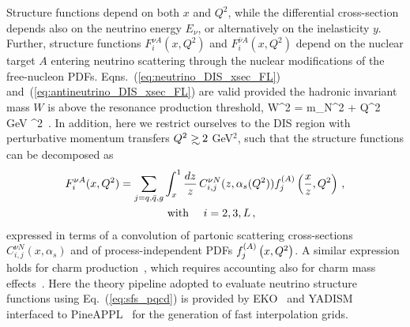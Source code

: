 Structure functions depend on both $x$ and $Q^2$, while the differential
cross-section depends also on the neutrino energy $E_\nu$, or alternatively
on the inelasticity $y$.
%
Further, structure functions $F^{\nu A}_i(x,Q^2)$ and $F^{\bar{\nu} A}_i(x,Q^2)$ depend on the nuclear target $A$ entering neutrino scattering through the
nuclear modifications of the free-nucleon PDFs.
%
Eqns.~(\ref{eq:neutrino_DIS_xsec_FL}) and~(\ref{eq:antineutrino_DIS_xsec_FL}) are valid provided
the hadronic 
invariant mass $W$  is above the resonance production threshold,
\be
\label{eq:W2_invmass}
W^2 = \lp m_N^2 + Q^2  \rp \gsim {}\,{\rm GeV} \rp^2\, .
\ee
In addition, here we  restrict ourselves to the DIS region with perturbative momentum
transfers $Q^2 \gsim 2$ GeV$^2$, such that the structure functions can be decomposed as
\begin{align}
	\label{eq:sfs_pqcd}
	F^{\nu A}_i(x,Q^2) = \sum_{j=q,\bar{q},g} & \int_x^1 {{dz}\over {z}}\, C_{i,j}^{\nu N}
	(z,\alpha_s(Q^2))f^{(A)}_j\left( {{x}\over {z}},Q^2\right) \, , \nonumber \\
	& \text{ with } \quad i = 2,3,L \, ,
\end{align}
%
 expressed
 in terms of a convolution of partonic scattering cross-sections  $C_{i,j}^{\nu N}(x,\alpha_s)$ and
of process-independent PDFs $f^{(A)}_j\left( x,Q^2\right)$.
%
A similar expression holds for charm production~\cite{Faura:2020oom}, which requires
accounting also for charm mass effects~\cite{Gao:2017kkx}.
%
Here the theory pipeline adopted
to evaluate neutrino structure functions using Eq.~(\ref{eq:sfs_pqcd}) is provided by 
{\sc\small EKO}~\cite{Candido:2022tld}
and {\sc\small YADISM}~\cite{yadism,Candido:2023utz}
interfaced to {\sc\small PineAPPL}~\cite{Carrazza:2020gss}
for the generation of fast interpolation grids. 

